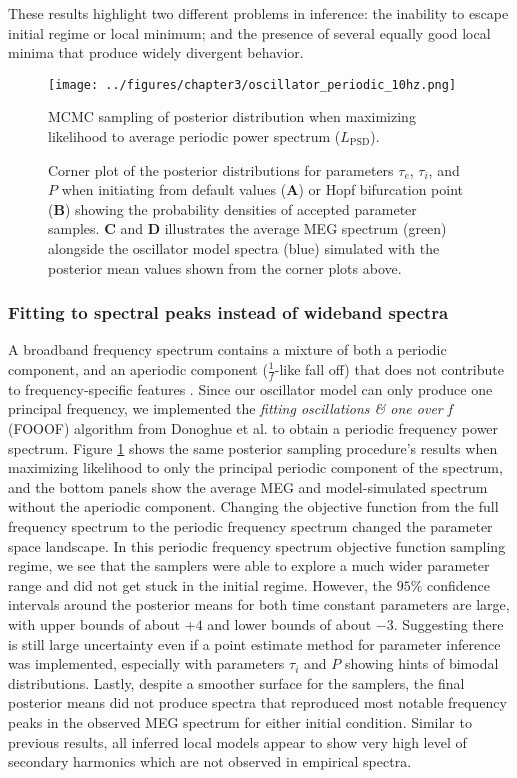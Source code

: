 These results highlight two different problems in inference: the inability to escape initial regime or local minimum; and the presence of several equally good local minima that produce widely divergent behavior.

\begin{figure}
    \centering
    \captionsetup{justification=centerlast}
    \texttt{[image: ../figures/chapter3/oscillator\_periodic\_10hz.png]}
   \caption{MCMC sampling of posterior distribution when maximizing likelihood to average periodic power spectrum ($L_{\textrm{PSD}}$).}
    \caption*{Corner plot of the posterior distributions for parameters $\tau_e$, $\tau_i$, and $P$ when initiating from default values (\textbf{A}) or Hopf bifurcation point (\textbf{B}) showing the probability densities of accepted parameter samples. \textbf{C} and \textbf{D} illustrates the average MEG spectrum (green) alongside the oscillator model spectra (blue) simulated with the posterior mean values shown from the corner plots above.}
    \label{fig:oscillator_periodic}
\end{figure}

\subsubsection{Fitting to spectral peaks instead of wideband spectra}
A broadband frequency spectrum contains a mixture of both a periodic component, and an aperiodic component ($\frac{1}{f}$-like fall off) that does not contribute to frequency-specific features \cite{donoghue_parameterizing_2020}. Since our oscillator model can only produce one principal frequency, we implemented the \emph{fitting oscillations \& one over f} (FOOOF) algorithm from Donoghue et al. \cite{donoghue_parameterizing_2020} to obtain a periodic frequency power spectrum. Figure \ref{fig:oscillator_periodic} shows the same posterior sampling procedure's results when maximizing likelihood to only the principal periodic component of the spectrum, and the bottom panels show the average MEG and model-simulated spectrum without the aperiodic component. Changing the objective function from the full frequency spectrum to the periodic frequency spectrum changed the parameter space landscape. In this periodic frequency spectrum objective function sampling regime, we see that the samplers were able to explore a much wider parameter range and did not get stuck in the initial regime. However, the $95\%$ confidence intervals around the posterior means for both time constant parameters are large, with upper bounds of about $+4$ and lower bounds of about $-3$. Suggesting there is still large uncertainty even if a point estimate method for parameter inference was implemented, especially with parameters $\tau_i$ and $P$ showing hints of bimodal distributions. Lastly, despite a smoother surface for the samplers, the final posterior means did not produce spectra that reproduced most notable frequency peaks in the observed MEG spectrum for either initial condition. Similar to previous results, all inferred local models appear to show very high level of secondary harmonics which are not observed in empirical spectra. 


